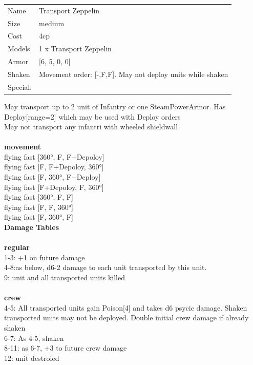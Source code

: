 \begin{tabular}{ll}
  Name & Transport Zeppelin \\
  Size & medium\\
  Cost & 4cp\\
  Models & 1 x Transport Zeppelin\\
  Armor & [6, 5, 0, 0]\\
  Shaken & Movement order: [-,F,F]. May not deploy units while shaken\\
  Special: \\
\end{tabular}

\noindent May transport up to 2 unit of Infantry or one SteamPowerArmor. Has Deploy[range=2] which may be used with Deploy orders\\ 
May not transport any infantri with wheeled shieldwall\\ 


\ \\ {\bf movement } \\
flying fast [360°, F, F+Depoloy] \\
flying fast [F, F+Depoloy, 360°] \\
flying fast [F, 360°, F+Deploy] \\
flying fast [F+Depoloy, F, 360°] \\
flying fast [360°, F, F] \\
flying fast [F, F, 360°] \\
flying fast [F, 360°, F] \\


{\bf Damage Tables} \\
\ \\ {\bf regular } \\
1-3: +1 on future damage \\
4-8:as below, d6-2 damage to each unit transported by this unit. \\
9: unit and all transported units killed \\
\ \\ {\bf crew } \\
4-5: All transported units gain Poison[4] and takes d6 psycic damage. Shaken transported units may not be deployed. Double initial crew damage if already shaken \\
6-7: As 4-5, shaken \\
8-11: as 6-7, +3 to future crew damage \\
12: unit destroied \\



